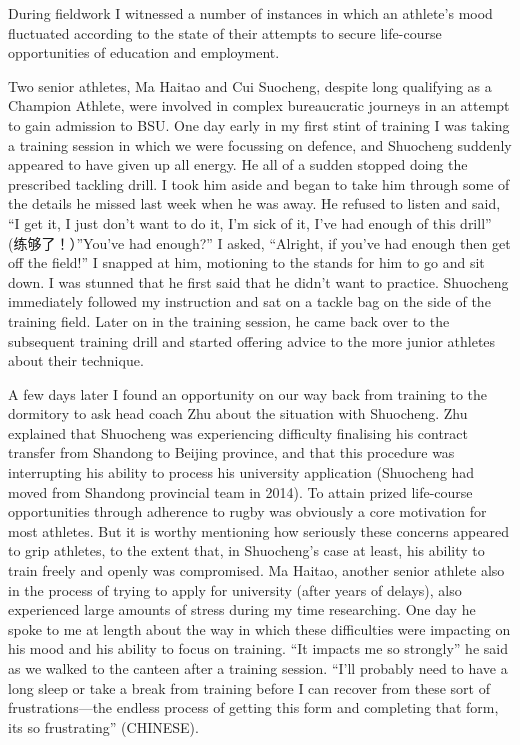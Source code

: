 \begin{CJK}{UTF8}{gbsn}
During fieldwork I witnessed a number of instances in which an athlete's mood fluctuated according to the state of their attempts to secure life-course opportunities of education and employment.

Two senior athletes, Ma Haitao and Cui Suocheng, despite long qualifying as a Champion Athlete, were involved in complex bureaucratic journeys in an attempt to gain admission to BSU.  One day early in my first stint of training I was taking a training session in which we were focussing on defence, and Shuocheng suddenly appeared to have given up all energy.  He all of a sudden stopped doing the prescribed tackling drill.  I took him aside and began to take him through some of the details he missed last week when he was away.  He refused to listen and said, ``I get it, I just don’t want to do it, I’m sick of it, I’ve had enough of this drill'' (练够了！）''You’ve had enough?'' I asked, ``Alright, if you’ve had enough then get off the field!''  I snapped at him, motioning to the stands for him to go and sit down. I was stunned that he first said that he didn’t want to practice.  Shuocheng immediately followed my instruction and sat on a tackle bag on the side of the training field.  Later on in the training session, he came back over to the subsequent training drill and started offering advice to the more junior athletes about their technique.

A few days later I found an opportunity on our way back from training to the dormitory to ask head coach Zhu about the situation with Shuocheng.  Zhu explained that Shuocheng was experiencing difficulty finalising his contract transfer from Shandong to Beijing province, and that this procedure was interrupting his ability to process his university application (Shuocheng had moved from Shandong provincial team in 2014). To attain prized life-course opportunities through adherence to rugby was obviously a core motivation for most athletes.  But it is worthy mentioning how seriously these concerns appeared to grip athletes, to the extent that, in Shuocheng's case at least, his ability to train freely and openly was compromised.  Ma Haitao, another senior athlete also in the process of trying to apply for university (after years of delays), also experienced large amounts of stress during my time researching.  One day he spoke to me at length about the way in which these difficulties were impacting on his mood and his ability to focus on training. ``It impacts me so strongly'' he said as we walked to the canteen after a training session.  ``I’ll probably need to have a long sleep or take a break from training before I can recover from these sort of frustrations---the endless process of getting this form and completing that form, its so frustrating'' (CHINESE).


\end{CJK}
